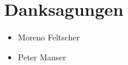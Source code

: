 \chapter*{Danksagungen}
\begin{itemize}
  \item Moreno Feltscher
  \item Peter Manser
\end{itemize}
